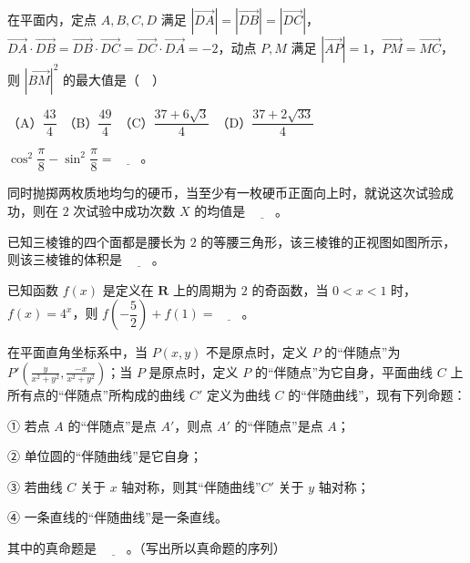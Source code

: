 \begin{question}
在平面内，定点 \(A,B,C,D\) 满足 \(\left|\overrightarrow{DA}\right|=\left|\overrightarrow{DB}\right|=\left|\overrightarrow{DC}\right|\)，\(\overrightarrow{DA}\cdot\overrightarrow{DB}=\overrightarrow{DB}\cdot\overrightarrow{DC}=\overrightarrow{DC}\cdot\overrightarrow{DA}=-2\)，动点 \(P,M\) 满足 \(\left|\overrightarrow{AP}\right|=1\)，\(\overrightarrow{PM}=\overrightarrow{MC}\)，则 \(\left|\overrightarrow{BM}\right|^{2}\) 的最大值是（　）

（A）\(\dfrac{43}{4}\)　（B）\(\dfrac{49}{4}\)　（C）\(\dfrac{37+6\sqrt{3}}{4}\)　（D）\(\dfrac{37+2\sqrt{33}}{4}\)

\end{question}

\begin{question}
\(\cos^{2}\dfrac{\pi}{8}-\sin^{2}\dfrac{\pi}{8}=\underline{\qquad}\)。

\end{question}
\begin{question}
同时抛掷两枚质地均匀的硬币，当至少有一枚硬币正面向上时，就说这次试验成功，则在 \(2\) 次试验中成功次数 \(X\) 的均值是 \(\underline{\qquad}\)。

\Needspace{0.4\textheight}
\end{question}
\begin{question}
已知三棱锥的四个面都是腰长为 \(2\) 的等腰三角形，该三棱锥的正视图如图所示，则该三棱锥的体积是 \(\underline{\qquad}\)。
\nopagebreak[4]
\begin{center}\end{center}
\nopagebreak[4]
\end{question}
\begin{question}
已知函数 \(f(x)\) 是定义在 \(\mathbf{R}\) 上的周期为 \(2\) 的奇函数，当 \(0<x<1\) 时，\(f(x)=4^{x}\)，则 \(f\left(-\dfrac{5}{2}\right)+f(1)=\underline{\qquad}\)。

\end{question}
\begin{question}
在平面直角坐标系中，当 \(P(x,y)\) 不是原点时，定义 \(P\) 的“伴随点”为 \(P'\left(\frac{y}{x^{2}+y^{2}},\frac{-x}{x^{2}+y^{2}}\right)\)；当 \(P\) 是原点时，定义 \(P\) 的“伴随点”为它自身，平面曲线 \(C\) 上所有点的“伴随点”所构成的曲线 \(C'\) 定义为曲线 \(C\) 的“伴随曲线”，现有下列命题：

① 若点 \(A\) 的“伴随点”是点 \(A'\)，则点 \(A'\) 的“伴随点”是点 \(A\)；

② 单位圆的“伴随曲线”是它自身；

③ 若曲线 \(C\) 关于 \(x\) 轴对称，则其“伴随曲线”\(C'\) 关于 \(y\) 轴对称；

④ 一条直线的“伴随曲线”是一条直线。

其中的真命题是 \(\underline{\qquad}\)。（写出所以真命题的序列）

\end{question}

